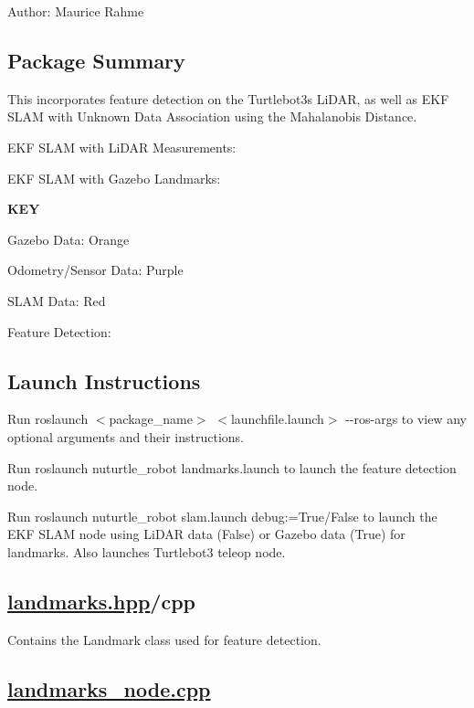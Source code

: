 Author\+: Maurice Rahme

\subsection*{Package Summary}

This incorporates feature detection on the Turtlebot3\textquotesingle{}s Li\+D\+AR, as well as E\+KF S\+L\+AM with Unknown Data Association using the Mahalanobis Distance.

E\+KF S\+L\+AM with Li\+D\+AR Measurements\+:



E\+KF S\+L\+AM with Gazebo Landmarks\+:



{\bfseries K\+EY}
\begin{DoxyItemize}
\item Gazebo Data\+: Orange
\item Odometry/\+Sensor Data\+: Purple
\item S\+L\+AM Data\+: Red
\end{DoxyItemize}

Feature Detection\+:



\subsection*{Launch Instructions}

Run {\ttfamily roslaunch $<$package\+\_\+name$>$ $<$launchfile.\+launch$>$ -\/-\/ros-\/args} to view any optional arguments and their instructions.

Run {\ttfamily roslaunch nuturtle\+\_\+robot landmarks.\+launch} to launch the feature detection node.

Run {\ttfamily roslaunch nuturtle\+\_\+robot slam.\+launch debug\+:=True/\+False} to launch the E\+KF S\+L\+AM node using Li\+D\+AR data (False) or Gazebo data (True) for landmarks. Also launches Turtlebot3 teleop node.

\subsection*{\hyperlink{landmarks_8hpp}{landmarks.\+hpp}/cpp}

Contains the {\ttfamily Landmark} class used for feature detection.

\subsection*{\hyperlink{landmarks__node_8cpp}{landmarks\+\_\+node.\+cpp}}

